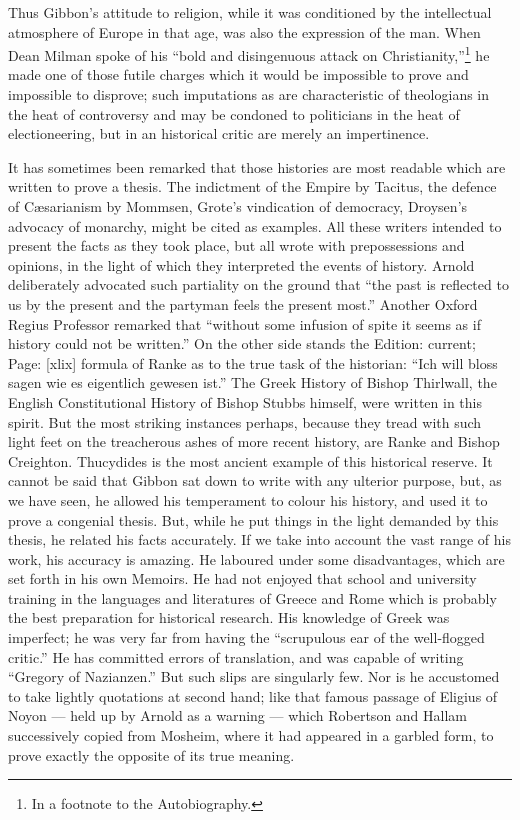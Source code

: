 {}Thus Gibbon\texthebrew{}’s attitude to religion, while it was conditioned by the intellectual atmosphere of Europe in that age, was also the expression of the man. When Dean Milman spoke of his \texthebrew{“}bold and disingenuous attack on Christianity,\texthebrew{}”\footnote{In a footnote to the Autobiography.} he made one of those futile charges which it would be impossible to prove and impossible to disprove; such imputations as are characteristic of theologians in the heat of controversy and may be condoned to politicians in the heat of electioneering, but in an historical critic are merely an impertinence.

It has sometimes been remarked that those histories are most readable which are written to prove a thesis. The indictment of the Empire by Tacitus, the defence of Cæsarianism by Mommsen, Grote\texthebrew{}’s vindication of democracy, Droysen\texthebrew{}’s advocacy of monarchy, might be cited as examples. All these writers intended to present the facts as they took place, but all wrote with prepossessions and opinions, in the light of which they interpreted the events of history. Arnold deliberately advocated such partiality on the ground that \texthebrew{“}the past is reflected to us by the present and the partyman feels the present most.\texthebrew{}” Another Oxford Regius Professor remarked that \texthebrew{“}without some infusion of spite it seems as if history could not be written.\texthebrew{}” On the other side stands the Edition: current; Page: [xlix] formula of Ranke as to the true task of the historian: \texthebrew{“}Ich will bloss sagen wie es eigentlich gewesen ist.\texthebrew{}” The Greek History of Bishop Thirlwall, the English Constitutional History of Bishop Stubbs himself, were written in this spirit. But the most striking instances perhaps, because they tread with such light feet on the treacherous ashes of more recent history, are Ranke and Bishop Creighton. Thucydides is the most ancient example of this historical reserve. It cannot be said that Gibbon sat down to write with any ulterior purpose, but, as we have seen, he allowed his temperament to colour his history, and used it to prove a congenial thesis. But, while he put things in the light demanded by this thesis, he related his facts accurately. If we take into account the vast range of his work, his accuracy is amazing. He laboured under some disadvantages, which are set forth in his own Memoirs. He had not enjoyed that school and university training in the languages and literatures of Greece and Rome which is probably the best preparation for historical research. His knowledge of Greek was imperfect; he was very far from having the \texthebrew{“}scrupulous ear of the well-flogged critic.\texthebrew{}” He has committed errors of translation, and was capable of writing \texthebrew{“}Gregory of Nazianzen.\texthebrew{}” But such slips are singularly few. Nor is he accustomed to take lightly quotations at second hand; like that famous passage of Eligius of Noyon \texthebrew{—} held up by Arnold as a warning \texthebrew{—} which Robertson and Hallam successively copied from Mosheim, where it had appeared in a garbled form, to prove exactly the opposite of its true meaning.

